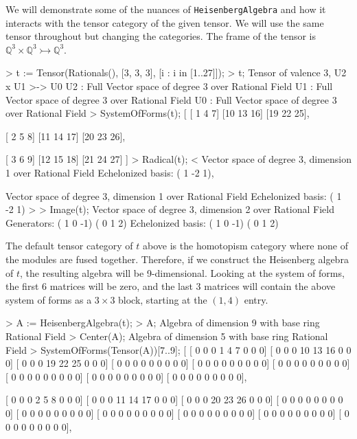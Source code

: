 \begin{example}[CraftingAlgebras]

We will demonstrate some of the nuances of \texttt{HeisenbergAlgebra} and how it
interacts with the tensor category of the given tensor. We will use the same
tensor throughout but changing the categories. The frame of the tensor is
$\mathbb{Q}^3\times\mathbb{Q}^3\rightarrowtail\mathbb{Q}^3$.
\begin{code}
> t := Tensor(Rationals(), [3, 3, 3], [i : i in [1..27]]);
> t;
Tensor of valence 3, U2 x U1 >-> U0
U2 : Full Vector space of degree 3 over Rational Field
U1 : Full Vector space of degree 3 over Rational Field
U0 : Full Vector space of degree 3 over Rational Field
> SystemOfForms(t);
[
    [ 1  4  7]
    [10 13 16]
    [19 22 25],

    [ 2  5  8]
    [11 14 17]
    [20 23 26],

    [ 3  6  9]
    [12 15 18]
    [21 24 27]
]
> Radical(t);
<
    Vector space of degree 3, dimension 1 over Rational Field
    Echelonized basis:
    ( 1 -2  1),

    Vector space of degree 3, dimension 1 over Rational Field
    Echelonized basis:
    ( 1 -2  1)
>
> Image(t);
Vector space of degree 3, dimension 2 over Rational Field
Generators:
( 1  0 -1)
( 0  1  2)
Echelonized basis:
( 1  0 -1)
( 0  1  2)
\end{code}

The default tensor category of $t$ above is the homotopism category where none
of the modules are fused together. Therefore, if we construct the Heisenberg
algebra of $t$, the resulting algebra will be 9-dimensional. Looking at the
system of forms, the first 6 matrices will be zero, and the last 3 matrices will
contain the above system of forms as a $3\times 3$ block, starting at the
$(1,4)$ entry.
\begin{code}
> A := HeisenbergAlgebra(t);
> A;
Algebra of dimension 9 with base ring Rational Field
> Center(A);
Algebra of dimension 5 with base ring Rational Field
> SystemOfForms(Tensor(A))[7..9];
[
    [ 0  0  0  1  4  7  0  0  0]
    [ 0  0  0 10 13 16  0  0  0]
    [ 0  0  0 19 22 25  0  0  0]
    [ 0  0  0  0  0  0  0  0  0]
    [ 0  0  0  0  0  0  0  0  0]
    [ 0  0  0  0  0  0  0  0  0]
    [ 0  0  0  0  0  0  0  0  0]
    [ 0  0  0  0  0  0  0  0  0]
    [ 0  0  0  0  0  0  0  0  0],

    [ 0  0  0  2  5  8  0  0  0]
    [ 0  0  0 11 14 17  0  0  0]
    [ 0  0  0 20 23 26  0  0  0]
    [ 0  0  0  0  0  0  0  0  0]
    [ 0  0  0  0  0  0  0  0  0]
    [ 0  0  0  0  0  0  0  0  0]
    [ 0  0  0  0  0  0  0  0  0]
    [ 0  0  0  0  0  0  0  0  0]
    [ 0  0  0  0  0  0  0  0  0],


\end{code}
\end{example}
